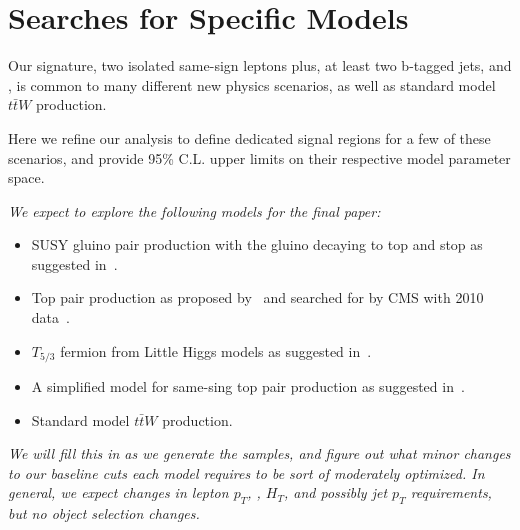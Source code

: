 \section{Searches for Specific Models}
\label{sec:stampCollecting}

Our signature, two isolated same-sign leptons plus, at least two b-tagged jets, and \met, 
is common to many different new physics scenarios, as well as standard model $t\bar{t}W$ production.

Here we refine our analysis to define dedicated signal regions for a few of these scenarios,
and provide 95\% C.L. upper limits on their respective model parameter space.

{\it We expect to explore the following models for the final paper:}

\begin{itemize}
\item SUSY gluino pair production with the gluino decaying to top and stop as suggested in~\cite{susyssbtags}.
\item Top pair production as proposed by~\cite{berger} and searched for by CMS with 2010 data~\cite{sstop}.
\item $T_{5/3}$ fermion from Little Higgs models as suggested in~\cite{littlehiggs}.
\item A simplified model for same-sing top pair production as suggested in~\cite{simplifiedModel}.
\item Standard model $t\bar{t}W$ production.
\end{itemize}

{\it We will fill this in as we generate the samples, and figure out what minor changes to our baseline cuts each model
requires to be sort of moderately optimized. In general, we expect changes in lepton $p_T$, \met, $H_T$, and possibly
jet $p_T$ requirements, but no object selection changes.}

